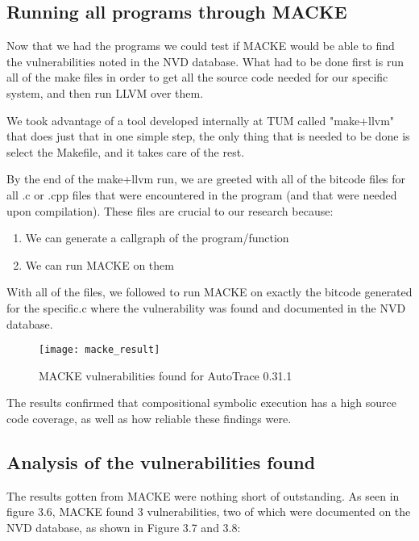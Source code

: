 \subsection{Running all programs through MACKE}

Now that we had the programs we could test if MACKE would be able to find the vulnerabilities noted in the NVD database.
What had to be done first is run all of the make files in order to get all the source code needed for our specific system, and then run LLVM over them.

We took advantage of a tool developed internally at TUM called "make+llvm"\parencite{thomasThesis} that does just that in one simple step, the only thing that is needed to be done is select the Makefile, and it takes care of the rest.

By the end of the make+llvm run, we are greeted with all of the bitcode files for all .c or .cpp files that were encountered in the program (and that were needed upon compilation). These files are crucial to our research because:

\begin{enumerate}
	\item We can generate a callgraph of the program/function
	\item We can run MACKE on them
\end{enumerate}

With all of the files, we followed to run MACKE on exactly the bitcode generated for the specific.c where the vulnerability was found and documented in the NVD database.

\begin{figure}[!htb]
	\caption{MACKE vulnerabilities found for AutoTrace 0.31.1}
	\centering
	\texttt{[image: macke\_result]}
\end{figure}

The results confirmed that compositional symbolic execution has a high source code coverage, as well as how reliable these findings were.

\subsection{Analysis of the vulnerabilities found}

The results gotten from MACKE were nothing short of outstanding. As seen in figure 3.6, MACKE found 3 vulnerabilities, two of which were documented on the NVD database, as shown in Figure 3.7 and 3.8:

